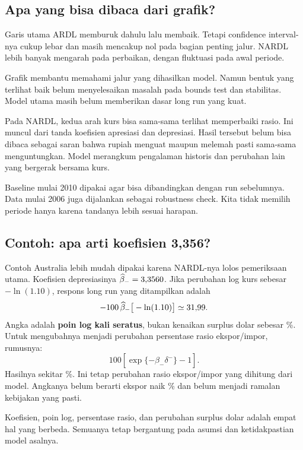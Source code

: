 \subsection{Apa yang bisa dibaca dari grafik?}
Garis utama ARDL memburuk dahulu lalu membaik. Tetapi confidence interval-nya cukup lebar dan masih mencakup nol pada bagian penting jalur. NARDL lebih banyak mengarah pada perbaikan, dengan fluktuasi pada awal periode.

Grafik membantu memahami jalur yang dihasilkan model. Namun bentuk yang terlihat baik belum menyelesaikan masalah pada bounds test dan stabilitas. Model utama masih belum memberikan dasar long run yang kuat.

Pada NARDL, kedua arah kurs bisa sama-sama terlihat memperbaiki rasio. Ini muncul dari tanda koefisien apresiasi dan depresiasi. Hasil tersebut belum bisa dibaca sebagai saran bahwa rupiah menguat maupun melemah pasti sama-sama menguntungkan. Model merangkum pengalaman historis dan perubahan lain yang bergerak bersama kurs.

Baseline mulai 2010 dipakai agar bisa dibandingkan dengan run sebelumnya. Data mulai 2006 juga dijalankan sebagai robustness check. Kita tidak memilih periode hanya karena tandanya lebih sesuai harapan.

\subsection{Contoh: apa arti koefisien 3,356?}
Contoh Australia lebih mudah dipakai karena NARDL-nya lolos pemeriksaan utama. Koefisien depresiasinya $\widehat{\beta}_-=3{,}3560$. Jika perubahan log kurs sebesar $-\ln(1.10)$, respons long run yang ditampilkan adalah
\begin{equation}
 -100\,\widehat{\beta}_-\big[-\ln(1.10)\big]\simeq31{,}99.
\end{equation}
Angka \AusResponse{} adalah \textbf{poin log kali seratus}, bukan kenaikan surplus dolar sebesar \AusResponse\%. Untuk mengubahnya menjadi perubahan persentase rasio ekspor/impor, rumusnya:
\begin{equation}
 100\left[\exp\{-\widehat{\beta}_-\delta^-\}-1\right].
\end{equation}
Hasilnya sekitar \AusRatioPct\%. Ini tetap perubahan rasio ekspor/impor yang dihitung dari model. Angkanya belum berarti ekspor naik \AusRatioPct\% dan belum menjadi ramalan kebijakan yang pasti.

Koefisien, poin log, persentase rasio, dan perubahan surplus dolar adalah empat hal yang berbeda. Semuanya tetap bergantung pada asumsi dan ketidakpastian model asalnya.
